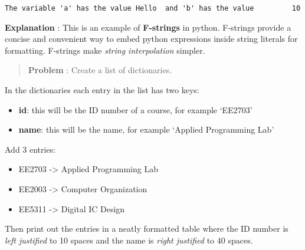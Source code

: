 \documentclass[11pt]{article}
\begin{document}
    \begin{Verbatim}[commandchars=\\\{\}]
The variable 'a' has the value Hello  and 'b' has the value         10
    \end{Verbatim}

    \textbf{Explanation} : This is an example of \textbf{F-strings} in
python. F-strings provide a concise and convenient way to embed python
expressions inside string literals for formatting. F-strings make
\emph{string interpolation} simpler.

    \begin{quote}
\textbf{Problem} : Create a list of dictionaries.
\end{quote}

In the dictionaries each entry in the list has two keys: 
\begin{itemize}
    \item \textbf{id}:
this will be the ID number of a course, for example `EE2703' 
    \item \textbf{name}: this will be the name, for example `Applied Programming
Lab'
\end{itemize}

Add 3 entries:
\begin{itemize}
    \item 
EE2703 -\textgreater{} Applied Programming Lab
\item
EE2003 -\textgreater{} Computer Organization 
\item
EE5311 -\textgreater{}
Digital IC Design
\end{itemize}

Then print out the entries in a neatly formatted table
where the ID number is \emph{left justified} to 10 spaces and the name
is \emph{right justified} to 40 spaces.
\end{document}

